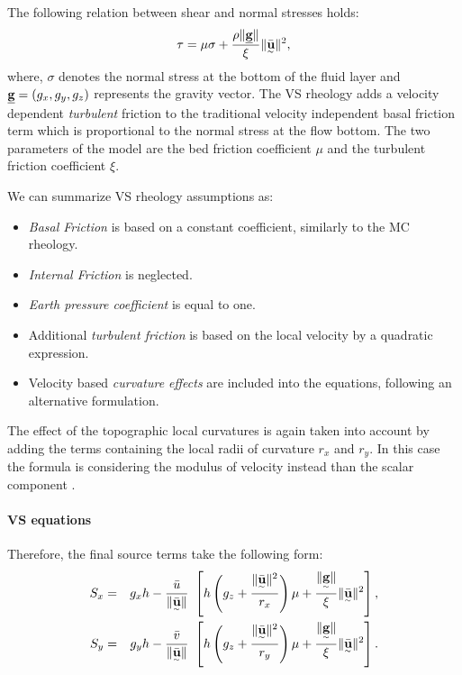 \documentclass{article}
\begin{document}
The following relation between shear and normal stresses holds:
\begin{equation}
\tau = \mu \sigma + \frac{\rho \| \underline{\textbf g} \|}{\xi} \| \underset{^\sim}{\bar{\textbf u}} \|^2,
\end{equation}
where, $\sigma$ denotes the normal stress at the bottom of the fluid layer and $\underline{\textbf g} = (g_{x} , g_{y} , g_{z})$ represents the gravity vector. The VS rheology adds a velocity dependent \emph{turbulent} friction to the traditional velocity independent basal friction term which is proportional to the normal stress at the flow bottom. The two parameters of the model are the bed friction coefficient $\mu$ and the turbulent friction coefficient $\xi$.

We can summarize VS rheology assumptions as:
\begin{itemize}
\item \textit{Basal Friction} is based on a constant coefficient, similarly to the MC rheology.

\item \textit{Internal Friction} is neglected.

\item \textit{Earth pressure coefficient} is equal to one.

\item Additional \textit{turbulent friction} is based on the local velocity by a quadratic expression.

\item Velocity based \textit{curvature effects} are included into the equations, following an alternative formulation.
\end{itemize}

The effect of the topographic local curvatures is again taken into account by adding the terms containing the local radii of curvature $r_x$ and $r_y$. In this case the formula is considering the modulus of velocity instead than the scalar component \cite{PudasainiHutter2003,Fischer2012}.

\paragraph{VS equations} Therefore, the final source terms take the following form:
\begin{eqnarray}
\label{eq:S_terms_VS}
S_{x} &=&  g_{x} h - \frac{\bar{u}}{\| \underset{^\sim}{\bar{\textbf u}}\|} \ \left[ h \left(g_{z} + \frac{\| \underset{^\sim}{\bar{\textbf u}} \|^2}{r_{x}} \right)\mu+ \frac{\| \underset{^\sim}{\textbf g} \|}{\xi}\| \underset{^\sim}{\bar{\textbf u}} \|^2\right], \nonumber \\
S_{y} &=& g_{y} h - \frac{\bar{v}}{\| \underset{^\sim}{\bar{\textbf u}}\|} \ \left[ h \left(g_{z} + \frac{\| \underset{^\sim}{\bar{\textbf u}} \|^2}{r_{y}} \right)\mu+ \frac{\| \underset{^\sim}{\textbf g} \|}{\xi}\| \underset{^\sim}{\bar{\textbf u}} \|^2\right].
\end{eqnarray}
\end{document}
